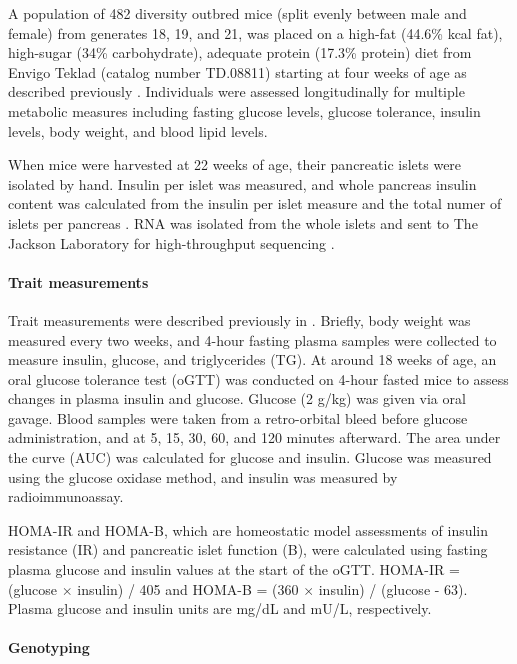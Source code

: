 \documentclass[
]{article}
\begin{document}
A population of 482 diversity outbred mice (split evenly between male
and female) from generates 18, 19, and 21, was placed on a high-fat
(44.6\% kcal fat), high-sugar (34\% carbohydrate), adequate protein
(17.3\% protein) diet from Envigo Teklad (catalog number TD.08811)
starting at four weeks of age as described previously
\cite{pmid29567659}. Individuals were assessed longitudinally for
multiple metabolic measures including fasting glucose levels, glucose
tolerance, insulin levels, body weight, and blood lipid levels.

When mice were harvested at 22 weeks of age, their pancreatic islets
were isolated by hand. Insulin per islet was measured, and whole
pancreas insulin content was calculated from the insulin per islet
measure and the total numer of islets per pancreas \cite{pmid29567659}.
RNA was isolated from the whole islets and sent to The Jackson
Laboratory for high-throughput sequencing \cite{pmid29567659}.

\paragraph{Trait measurements}\label{trait-measurements}

Trait measurements were described previously in \cite{pmid29567659}.
Briefly, body weight was measured every two weeks, and 4-hour fasting
plasma samples were collected to measure insulin, glucose, and
triglycerides (TG). At around 18 weeks of age, an oral glucose tolerance
test (oGTT) was conducted on 4-hour fasted mice to assess changes in
plasma insulin and glucose. Glucose (2 g/kg) was given via oral gavage.
Blood samples were taken from a retro-orbital bleed before glucose
administration, and at 5, 15, 30, 60, and 120 minutes afterward. The
area under the curve (AUC) was calculated for glucose and insulin.
Glucose was measured using the glucose oxidase method, and insulin was
measured by radioimmunoassay.

HOMA-IR and HOMA-B, which are homeostatic model assessments of insulin
resistance (IR) and pancreatic islet function (B), were calculated using
fasting plasma glucose and insulin values at the start of the oGTT.
HOMA-IR = (glucose \(\times\) insulin) / 405 and HOMA-B = (360
\(\times\) insulin) / (glucose - 63). Plasma glucose and insulin units
are mg/dL and mU/L, respectively.

\paragraph{Genotyping}\label{genotyping}
\end{document}

